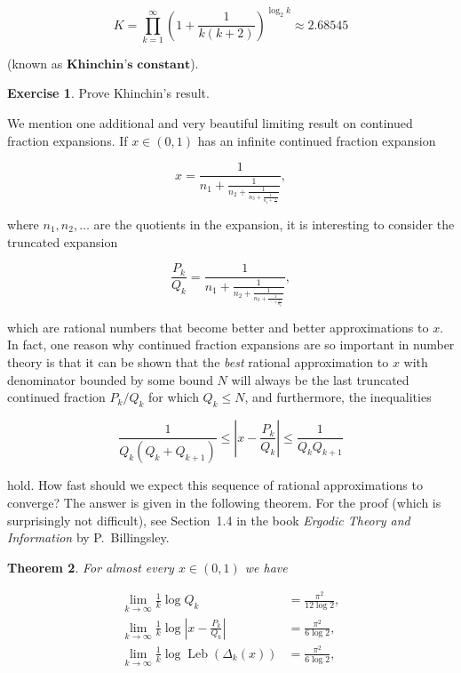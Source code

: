 \documentclass[11pt]{report}
\theoremstyle{plain}
\newtheorem{thm}{Theorem}[chapter]
\theoremstyle{definition}
\newtheorem{xexercise}[thm]{Exercise}
\begin{document}
\begin{enumerate}[label=\arabic*.]
\[
K = \prod_{k=1}^\infty \left( 1+\frac{1}{k(k+2)} \right)^{\log_2 k} \approx 2.68545
\]

\noindent (known as $\textbf{Khinchin's constant}$).

\begin{xexercise}
Prove Khinchin's result.
\end{xexercise}

\noindent We mention one additional and very beautiful limiting
result on continued fraction expansions. If
$x\in (0,1)$ has an infinite continued fraction
expansion

\[
x = \frac{1}{n_1+\frac{1}{n_2+\frac{1}{n_3+\frac{1}{n_4+\frac{1}{\ldots}}}}},
\]

\noindent where $n_1,n_2,\ldots$ are the quotients in the
expansion, it is interesting to consider the truncated
expansion

\[
\frac{P_k}{Q_k} = \frac{1}{n_1+\frac{1}{n_2+\frac{1}{n_3+\frac{1}{\ddots+\frac{1}{n_k}}}}},
\]

\noindent which are rational numbers that become better and
better approximations to $x$. In fact, one reason why
continued fraction expansions are so important in
number theory is that it can be shown that the \emph{best}
rational approximation to $x$ with denominator
bounded by some bound $N$ will always be the last
truncated continued fraction $P_k/Q_k$ for which
$Q_k\le N$, and furthermore, the inequalities

\begin{equation*} \tag{22}\label{eq:cont-frac-approx}
\frac{1}{Q_k (Q_k+Q_{k+1})} \le \left|x - \frac{P_k}{Q_k} \right| \le \frac{1}{Q_k Q_{k+1}}
\end{equation*}

\noindent hold. How fast should we expect this sequence of
rational approximations to converge? The answer is
given in the following theorem. For the proof (which
is surprisingly not difficult), see Section~1.4 in the
book \emph{Ergodic Theory and Information} by P.\
Billingsley.

\begin{thm}
For almost every $x\in (0,1)$ we have

\begin{align*}
\lim_{k\to\infty} \frac{1}{k}\log Q_k &= \tag{23}\label{eq:cont-frac-entropy1} \frac{\pi^2}{12\log 2},
\\
\lim_{k\to\infty} \frac{1}{k}\log \left| x-\frac{P_k}{Q_k} \right| &= \tag{24}\label{eq:cont-frac-entropy2} \frac{\pi^2}{6\log 2},
\\
\lim_{k\to\infty} \frac{1}{k}\log \operatorname{Leb}(\Delta_k(x)) &= \tag{25}\label{eq:cont-frac-entropy3} \frac{\pi^2}{6\log 2},
\end{align*}


\end{thm}
\end{enumerate}
\end{document}

